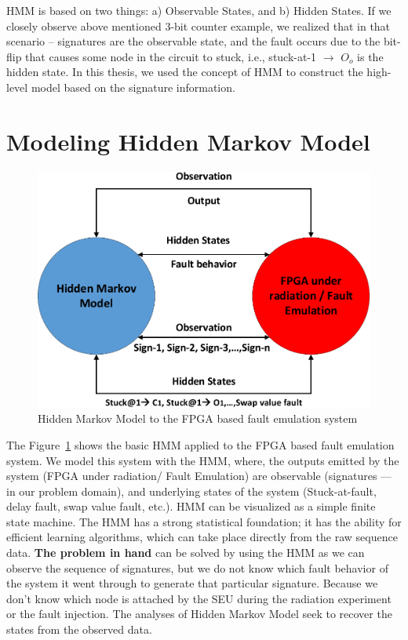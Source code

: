 HMM is based on  two things: a) Observable States, and b) Hidden States. If we closely observe above mentioned 3-bit counter example, we realized that in that scenario --  signatures are the observable state, and the fault occurs due to the bit-flip that causes some node in the circuit to stuck, i.e., stuck-at-1 $\rightarrow$ $O_o$ is the hidden state. In this thesis, we used the concept of HMM to construct the high-level model based on the signature information.

\section{Modeling Hidden Markov Model}
\begin{figure}[tb!]
 \centering
  \captionsetup{justification=centering}    
   \includegraphics[scale=0.8]{Figures/HMM-air.pdf}
   \caption{Hidden Markov Model to the FPGA based fault emulation system}
\label{fig:HMM-air}
\end{figure}
The Figure~\ref{fig:HMM-air} shows the basic HMM applied to the FPGA based fault emulation system. We model this system with the HMM, where, the outputs emitted by the system (FPGA under radiation/ Fault Emulation) are observable (signatures --- in our problem domain), and underlying states of the system (Stuck-at-fault, delay fault, swap value fault, etc.). HMM can be visualized as a simple finite state machine. The HMM has a strong statistical foundation; it has the ability for efficient learning algorithms, which can take place directly from the raw sequence data. \textbf{The problem in hand} can be solved by using the HMM as we can observe the sequence of signatures, but we do not know  which fault behavior  of the system it went through to generate that particular signature. Because we don't know which node is attached by the SEU during the radiation experiment or the fault injection. The analyses of Hidden Markov Model seek to recover the states from the observed data.


